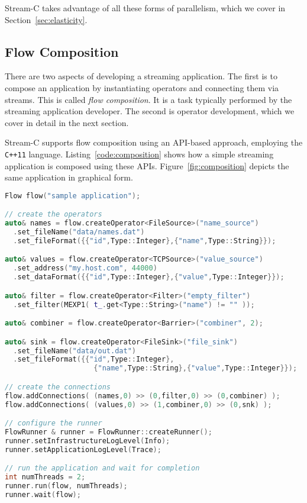 Stream-C takes advantage of all these forms of parallelism, which we cover in
Section~\ref{sec:elasticity}.

\subsection{Flow Composition}
There are two aspects of developing a streaming application. The first is to
compose an application by instantiating operators and connecting them via
streams. This is called \emph{flow composition}. It is a task typically
performed by the streaming application developer. The second is operator
development, which we cover in detail in the next section.

Stream-C supports flow composition using an API-based approach, employing the
\verb!C++11! language. Listing~\ref{code:composition} shows how a simple
streaming application is composed using these APIs.
Figure~\ref{fig:composition} depicts the same application in graphical form.

\begin{lstlisting}[language=C++, 
  caption={Flow composition in C-Stream.}, label=code:composition, captionpos=b,
  xleftmargin=0.25cm, columns=flexible, basicstyle={\scriptsize\ttfamily}]
Flow flow("sample application");

// create the operators
auto& names = flow.createOperator<FileSource>("name_source")
  .set_fileName("data/names.dat")
  .set_fileFormat({{"id",Type::Integer},{"name",Type::String}});

auto& values = flow.createOperator<TCPSource>("value_source")
  .set_address("my.host.com", 44000)
  .set_dataFormat({{"id",Type::Integer},{"value",Type::Integer}});

auto& filter = flow.createOperator<Filter>("empty_filter")
  .set_filter(MEXP1( t_.get<Type::String>("name") != "" ));

auto& combiner = flow.createOperator<Barrier>("combiner", 2);

auto& sink = flow.createOperator<FileSink>("file_sink")
  .set_fileName("data/out.dat")
  .set_fileFormat({{"id",Type::Integer}, 
  	                 {"name",Type::String},{"value",Type::Integer}});

// create the connections
flow.addConnections( (names,0) >> (0,filter,0) >> (0,combiner) );
flow.addConnections( (values,0) >> (1,combiner,0) >> (0,snk) );

// configure the runner
FlowRunner & runner = FlowRunner::createRunner();
runner.setInfrastructureLogLevel(Info);
runner.setApplicationLogLevel(Trace);

// run the application and wait for completion
int numThreads = 2;
runner.run(flow, numThreads);
runner.wait(flow);
\end{lstlisting}

